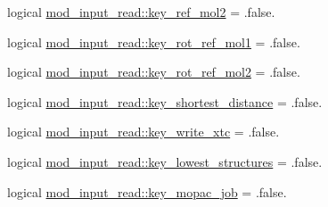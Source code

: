 \begin{DoxyCompactItemize}
\item 
logical \hyperlink{namespacemod__input__read_a0e0f6bb92252196980696d427c1e70ed}{mod\+\_\+input\+\_\+read\+::key\+\_\+ref\+\_\+mol2} = .false.
\item 
logical \hyperlink{namespacemod__input__read_aa5a0b3c68c22ac66d80805ec388ddc4a}{mod\+\_\+input\+\_\+read\+::key\+\_\+rot\+\_\+ref\+\_\+mol1} = .false.
\item 
logical \hyperlink{namespacemod__input__read_abf16c25db5c3926452c89143c7548df7}{mod\+\_\+input\+\_\+read\+::key\+\_\+rot\+\_\+ref\+\_\+mol2} = .false.
\item 
logical \hyperlink{namespacemod__input__read_a1956b5de5214082fc58fa663884d9fc8}{mod\+\_\+input\+\_\+read\+::key\+\_\+shortest\+\_\+distance} = .false.
\item 
logical \hyperlink{namespacemod__input__read_a3af1716773b868648513ab784756e599}{mod\+\_\+input\+\_\+read\+::key\+\_\+write\+\_\+xtc} = .false.
\item 
logical \hyperlink{namespacemod__input__read_a1f5f9ac3d207b274fa7eab7f06a7d472}{mod\+\_\+input\+\_\+read\+::key\+\_\+lowest\+\_\+structures} = .false.
\item 
logical \hyperlink{namespacemod__input__read_a273dcae5fbe1ea83ebf236f85d931560}{mod\+\_\+input\+\_\+read\+::key\+\_\+mopac\+\_\+job} = .false.
\end{DoxyCompactItemize}
